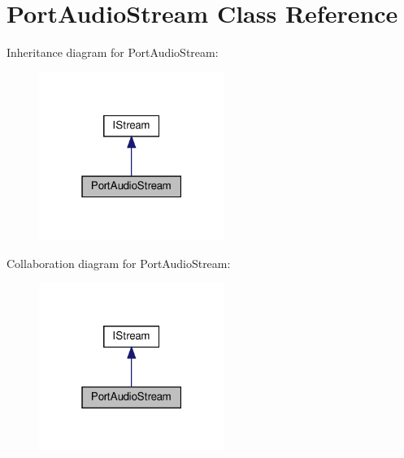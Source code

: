 \hypertarget{class_port_audio_stream}{}\section{Port\+Audio\+Stream Class Reference}
\label{class_port_audio_stream}


Inheritance diagram for Port\+Audio\+Stream\+:
\nopagebreak
\begin{figure}[H]
\begin{center}
\leavevmode
\includegraphics[width=171pt]{class_port_audio_stream__inherit__graph}
\end{center}
\end{figure}


Collaboration diagram for Port\+Audio\+Stream\+:
\nopagebreak
\begin{figure}[H]
\begin{center}
\leavevmode
\includegraphics[width=171pt]{class_port_audio_stream__coll__graph}
\end{center}
\end{figure}
